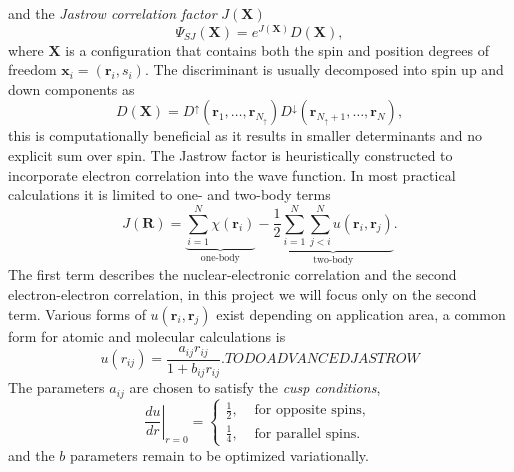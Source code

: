 \documentclass[final,3p,times,twocolumn]{elsarticle}
\begin{document}
	and the \emph{Jastrow correlation factor} $J(\mathbf{X})$
	\begin{equation}
		\Psi_{SJ}(\mathbf{X})=e^{J(\mathbf{X})} D(\mathbf{X}),
	\end{equation}
	where $\mathbf{X}$ is a configuration that contains both the spin and position degrees of freedom $\mathbf{x}_i = (\mathbf{r}_i, s_i)$. The discriminant is usually decomposed into spin up and down components as
	\begin{equation}
		D(\mathbf{X}) = D^{\uparrow}\left(\mathbf{r}_{1}, \ldots, \mathbf{r}_{N_{\uparrow}}\right) D^{\downarrow}\left(\mathbf{r}_{N_{\uparrow}+1}, \ldots, \mathbf{r}_{N}\right),
	\end{equation}
	this is computationally beneficial as it results in smaller determinants and no explicit sum over spin.
	The Jastrow factor is heuristically constructed to incorporate electron correlation into the wave function. In most practical calculations it is limited to one- and two-body terms~\cite{foulkes2001quantum}
	\begin{equation}
		J(\mathbf{R})=
		\underbrace{\sum_{i=1}^{N} \chi\left(\mathbf{r}_{i}\right)}_{\text{one-body}}
		-
		\underbrace{\frac{1}{2} \sum_{i=1}^{N} \sum_{j<i}^{N} u\left(\mathbf{r}_{i}, \mathbf{r}_{j}\right)}_{\text{two-body}}.
	\end{equation}
	The first term describes the nuclear-electronic correlation and the second electron-electron correlation, in this project we will focus only on the second term. 
	Various forms of $u(\mathbf{r}_{i}, \mathbf{r}_{j})$ exist depending on application area, a common form for atomic and molecular calculations is
	\begin{equation}
		u(r_{ij})=\frac{a_{ij} r_{ij}}{1+b_{ij} r_{ij}}. TODO ADVANCED JASTROW
	\end{equation}
	The parameters $a_{ij}$ are chosen to satisfy the \emph{cusp conditions},  
	\begin{equation}
		\left.\frac{d u}{d r}\right|_{r=0}=\left\{\begin{array}{cl}\frac{1}{2}, & \text { for opposite spins, } \\ \frac{1}{4}, & \text { for parallel spins. }\end{array}\right.
	\end{equation}
	and the $b$ parameters remain to be optimized variationally. 
	
\end{document}
